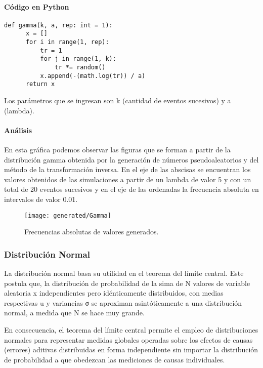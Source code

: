 \documentclass{article}
\begin{document}
  \paragraph{Código en Python}
  \begin{lstlisting}[style = Python]
   def gamma(k, a, rep: int = 1):
      x = []
      for i in range(1, rep):
          tr = 1
          for j in range(1, k):
              tr *= random()
          x.append(-(math.log(tr)) / a)
      return x
  \end{lstlisting}
  Los parámetros que se ingresan son k (cantidad de eventos sucesivos) y a (lambda).

  \paragraph{Análisis \newline}
  En esta gráfica podemos observar las figuras que se forman a partir de la distribución gamma obtenida por
  la generación de números pseudoaleatorios y del método de la transformación inversa. En el eje de las abscisas se
  encuentran los valores obtenidos de las simulaciones a partir de un lambda de valor 5 y con un total de 20 eventos
  sucesivos y en el eje de las ordenadas la frecuencia absoluta en intervalos de valor 0.01.

  \begin{figure}[h]
    \centering
    \texttt{[image: generated/Gamma]}
    \caption{Frecuencias absolutas de valores generados.}
  \end{figure}
  \newpage


  \subsubsection{Distribución Normal}
  La distribución normal basa su utilidad en el teorema del límite central. Este postula que, la distribución de probabilidad de la sima de N valores
  de variable aleatoria x independientes pero idénticamente distribuidos, con medias respectivas u y variancias σ se aproximan asintóticamente a una distribución normal, a medida
  que N se hace muy grande.

  En consecuencia, el teorema del límite central permite el empleo de distribuciones normales para representar medidas globales operadas sobre los efectos de causas (errores)
  aditivas distribuidas en forma independiente sin importar la distribución de probabilidad a que obedezcan las mediciones de causas individuales.
\end{document}
